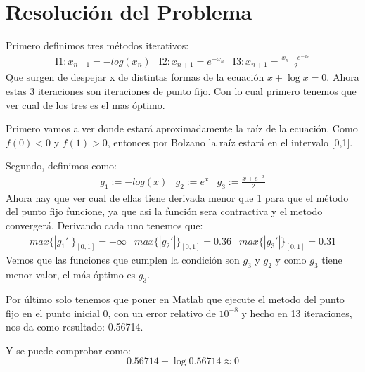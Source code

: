 \documentclass[a4paper]{article}
\begin{document}
\section{Resolución del Problema}
Primero definimos tres métodos iterativos:
\begin{equation}
\begin{array}{ccc}
\mathrm{I1:}x_{n+1}=-log(x_{n}) & \mathrm{I2:}x_{n+1}=e^{-x_{n}} & \mathrm{I3:}x_{n+1}=\frac{x_{n}+e^{-x_{n}}}{2}
\end{array}
\end{equation}
Que surgen de despejar x de distintas formas de la ecuación $x+\log{x}=0$. Ahora estas 3 iteraciones son iteraciones de punto fijo. Con lo cual primero tenemos que ver cual de los tres es el mas óptimo.

Primero vamos a ver donde estará aproximadamente la raíz de la ecuación. Como $f(0)<0$ y $f(1)>0$, entonces por Bolzano la raíz estará en el intervalo [0,1].

Segundo, definimos como:
\begin{equation}
\begin{array}{ccc}
g_{1}:=-log(x) & g_{2}:=e^{x} & g_{3}:=\frac{x+e^{-x}}{2}
\end{array}
\end{equation}
Ahora hay que ver cual de ellas tiene derivada menor que 1 para que el método del punto fijo funcione, ya que asi la función sera contractiva y el metodo convergerá. Derivando cada uno tenemos que:
\begin{equation}
\begin{array}{ccc}
max\{|g_{1}'|\}_{[0,1]}=+\infty & max\{|g_{2}'|\}_{[0,1]}=0.36 & max\{|g_{3}'|\}_{[0,1]}=0.31
\end{array}
\end{equation}
Vemos que las funciones que cumplen la condición son $g_{3}$ y $g_{2}$ y como $g_{3}$ tiene menor valor, el más óptimo es $g_{3}$.

Por último solo tenemos que poner en Matlab que ejecute el metodo del punto fijo en el punto inicial 0, con un error relativo de $10^{-8}$ y hecho en 13 iteraciones, nos da como resultado: 0.56714.

Y se puede comprobar como:
\begin{equation*}
0.56714+\log{0.56714}\approx 0
\end{equation*}
\end{document}
